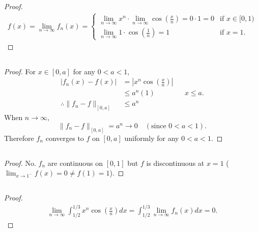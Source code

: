 \documentclass{article}
\title{\mytitle}
\author{\myname}
\date{\today}
\theoremstyle{plain}
\begin{document}
\maketitle
\section{}
\subsection{}
\begin{proof}
  \begin{align*}
    f(x)=\lim_{n\to\infty}f_{n}(x)=
    \begin{cases}
      \lim_{n\to\infty}x^{n}\cdot\lim_{n\to\infty}\cos(\frac{x}{n})=0\cdot1=0&\text{if
      }x\in[0,1)\\
      \lim_{n\to\infty}1\cdot\cos(\frac{1}{n})=1&\text{if }x=1.
    \end{cases}
  \end{align*}
\end{proof}
\subsection{}
\begin{proof}
For $x\in[0,a]$ for any $0<a<1$,
\begin{align*}
  |f_{n}(x)-f(x)|&=|x^{n}\cos(\frac{x}{n})|\\
                 &\le a^{n}(1)&&x\le a.\\
  \therefore\|f_{n}-f\|_{[0,a]}&\le a^{n}
\end{align*}
When $n\to\infty$, \[\|f_{n}-f\|_{[0,a]}=a^{n}\to0\quad(\text{since }0<a<1).\]
Therefore $f_{n}$ converges to $f$ on $[0,a]$ uniformly for any $0<a<1$.
\end{proof}
\subsection{}
\begin{proof}
No. $f_{n}$ are continuous on $[0,1]$ but $f$ is discontinuous at $x=1$
($\lim_{x\to1^{-}}f(x)=0\ne f(1)=1$).
\end{proof}
\subsection{}
\begin{proof}
\begin{align*}
  \lim_{n\to\infty}\int_{1/2}^{1/3}x^{n}\cos(\frac{x}{n})dx
  =\int_{1/2}^{1/3}\lim_{n\to\infty}f_{n}(x)dx
  =0.
\end{align*}
\end{proof}
\end{document}
